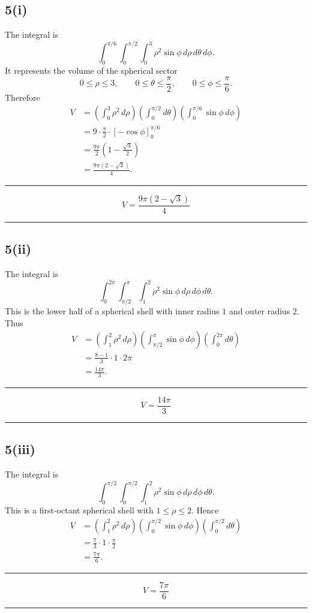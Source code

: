 \documentclass[11pt,a4paper]{article}
\newenvironment{resultbox}{\par\medskip\noindent\begin{minipage}{\linewidth}\hrule\smallskip}{\smallskip\hrule\end{minipage}\par\medskip}
\newcommand{\ans}[1]{\begin{resultbox}\[\boxed{#1}\]\end{resultbox}}
\begin{document}
\subsection*{5(i)}
The integral is
\[
\int_0^{\pi/6}\int_0^{\pi/2}\int_0^3 \rho^2\sin\phi\,d\rho\,d\theta\,d\phi.
\]
It represents the volume of the spherical sector
\[
0\le\rho\le3,
\qquad 0\le\theta\le\frac\pi2,
\qquad 0\le\phi\le\frac\pi6.
\]
Therefore
\begin{align*}
V&=\left(\int_0^3\rho^2\,d\rho\right)
\left(\int_0^{\pi/2}d\theta\right)
\left(\int_0^{\pi/6}\sin\phi\,d\phi\right)\\
&=9\cdot\frac\pi2\cdot\left[-\cos\phi\right]_0^{\pi/6}\\
&=\frac{9\pi}{2}\left(1-\frac{\sqrt3}{2}\right)\\
&=\frac{9\pi(2-\sqrt3)}{4}.
\end{align*}
\ans{V=\frac{9\pi(2-\sqrt3)}{4}}

\subsection*{5(ii)}
The integral is
\[
\int_0^{2\pi}\int_{\pi/2}^{\pi}\int_1^2\rho^2\sin\phi\,d\rho\,d\phi\,d\theta.
\]
This is the lower half of a spherical shell with inner radius \(1\) and outer radius \(2\). Thus
\begin{align*}
V&=\left(\int_1^2\rho^2\,d\rho\right)
\left(\int_{\pi/2}^{\pi}\sin\phi\,d\phi\right)
\left(\int_0^{2\pi}d\theta\right)\\
&=\frac{8-1}{3}\cdot 1\cdot2\pi\\
&=\frac{14\pi}{3}.
\end{align*}
\ans{V=\frac{14\pi}{3}}

\subsection*{5(iii)}
The integral is
\[
\int_0^{\pi/2}\int_0^{\pi/2}\int_1^2\rho^2\sin\phi\,d\rho\,d\phi\,d\theta.
\]
This is a first-octant spherical shell with \(1\le\rho\le2\). Hence
\begin{align*}
V&=\left(\int_1^2\rho^2\,d\rho\right)
\left(\int_0^{\pi/2}\sin\phi\,d\phi\right)
\left(\int_0^{\pi/2}d\theta\right)\\
&=\frac73\cdot1\cdot\frac\pi2\\
&=\frac{7\pi}{6}.
\end{align*}
\ans{V=\frac{7\pi}{6}}
\end{document}
